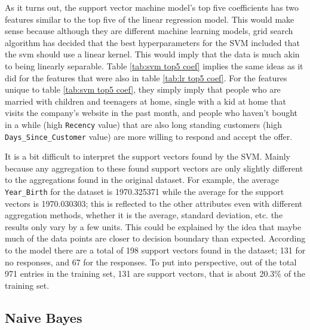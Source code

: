 As it turns out, the support vector machine model's top five coefficients has two features similar to the top five of the linear regression model. This would make sense because although they are different machine learning models, grid search algorithm has decided that the best hyperparameters for the SVM included that the svm should use a linear kernel. This would imply that the data is much akin to being linearly separable. Table \ref{tab:svm top5 coef} implies the same ideas as it did for the features that were also in table \ref{tab:lr top5 coef}. For the features unique to table \ref{tab:svm top5 coef}, they simply imply that people who are married with children and teenagers at home, single with a kid at home that visits the company's website in the past month, and people who haven't bought in a while (high \texttt{Recency} value) that are also long standing customers (high \texttt{Days\_Since\_Customer} value) are more willing to respond and accept the offer.

It is a bit difficult to interpret the support vectors found by the SVM. Mainly because any aggregation to these found support vectors are only slightly different to the aggregations found in the original dataset. For example, the average \texttt{Year\_Birth} for the dataset is 1970.325371 while the average for the support vectors is 1970.030303; this is reflected to the other attributes even with different aggregation methods, whether it is the average, standard deviation, etc. the results only vary by a few units. This could be explained by the idea that maybe much of the data points are closer to decision boundary than expected. According to the model there are a total of 198 support vectors found in the dataset; 131 for no responses, and 67 for the responses. To put into perspective, out of the total 971 entries in the training set, 131 are support vectors, that is about 20.3\% of the training set. 

\subsection{Naive Bayes}

